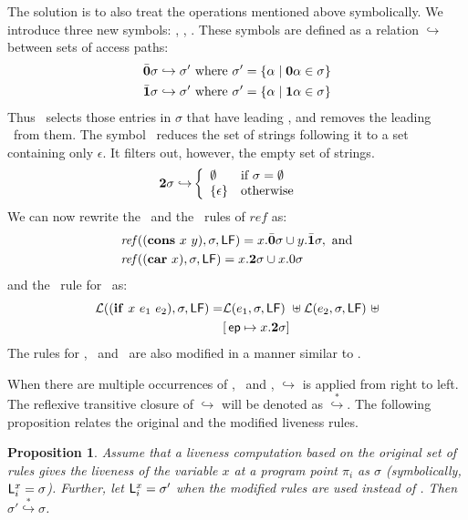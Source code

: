 \documentclass[9pt]{sigplanconf}
\newtheorem{proposition}[theorem]{Proposition}
\begin{document}
The  solution  is  to  also   treat  the  operations  mentioned  above
symbolically.  We  introduce three new symbols:  \bcar, \bcdr, \clazy.
These symbols are defined as a relation $\hookrightarrow$ between sets
of access paths:
\begin{align*}
  &\bar{\mathbf{0}}\sigma \hookrightarrow \sigma' \mbox{ where } \sigma' = \{\alpha \mid \mathbf{0}\alpha \in \sigma\}\\
  &\bar{\mathbf{1}}\sigma \hookrightarrow \sigma' \mbox{ where } \sigma' = \{\alpha \mid \mathbf{1}\alpha \in \sigma\}
\end{align*}
Thus \bcar\ selects those entries in $\sigma$ that have leading \acar, and removes the leading \acar\ from them.
The symbol \clazy\ reduces the set of strings following it to a set containing only $\epsilon$. It filters out, however, the empty set of strings.
\begin{align*}
  {\mathbf{2}}\sigma \hookrightarrow & \left\{ 
  \begin{array}{ll}
    \emptyset&\mbox{if}~\sigma = \emptyset\\
    \{\epsilon\} & \mbox{otherwise}
  \end{array}\right.
\end{align*}
We can  now rewrite the \CONS\  and the \CAR\  rules of $\mathit{ref}$
as:
\begin{align*}
&\mathit{ref\/}((\mbox{$\mathbf{cons}$}~x~y),\sigma,\mathsf{LF})
= x.\bar{\mathbf{0}}\sigma \cup y.\bar{\mathbf{1}}\sigma  \label{eqn:mod-cons},~
\mbox{and} \\
&\mathit{ref\/}((\mbox{$\mathbf{car}$}~x),\sigma,\mathsf{LF})
          =   x.{\mathbf{2}}\sigma \cup x.0\sigma
\end{align*}
and the \Lfunonly\ rule
for \SIF\ as:
\begin{align*}
\mathcal{L}((\mbox{$\mathbf{ if}$}~x~e_1~e_2),\sigma,\mathsf{LF}) =
                    &\mathcal{L}(e_1,\sigma,\mathsf{LF})~\uplus
        \mathcal{L}(e_2,\sigma,\mathsf{LF})~\uplus\\
        &[\,\mathit{\mathsf{ep}} \mapsto  x.{\mathbf{2}} \sigma]
\end{align*}
The rules for  \CDR, \PRIM\ and \NULLQ\ are also  modified in a manner
similar to \CAR. 

When  there  are  multiple  occurrences of  \bcar,  \bcdr\  and  \clazy,
$\hookrightarrow$  is  applied  from  right to  left.   The  reflexive
transitive   closure  of   $\hookrightarrow$   will   be  denoted   as
$\stackrel{*}{\hookrightarrow}$.   The  following proposition  relates
the original and the modified liveness rules.
\begin{proposition}
Assume that a liveness computation  based on the original set of rules
gives the liveness  of the variable $x$ at a  program point $\pi_i$ as
$\sigma$   (symbolically,   $\mathsf{L}_{{i}}^{x}=   \sigma$).   Further,   let
$\mathsf{L}_{{i}}^{x}=  \sigma'$ when the  modified rules  are used  instead of
\Lfunonly.  Then $\sigma' \stackrel{*}{\hookrightarrow} \sigma$.
\end{proposition}
\end{document}
